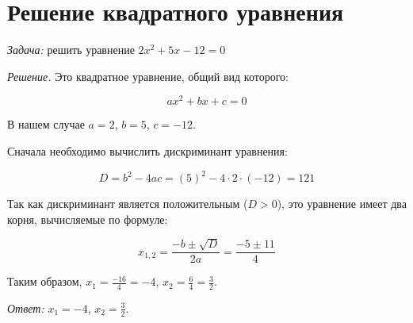 \documentclass[12pt]{article}
\begin{document}
\section{Решение квадратного уравнения}

\noindent \textit{Задача:} решить уравнение \( 2x^2 + 5x - 12 = 0 \)

\indent \textit{Решение.} Это квадратное уравнение, общий вид которого:

\[ ax^2 + bx + c = 0 \]


\noindent В нашем случае \( a = 2 \), \( b = 5 \), \( c = -12 \).

\indent Сначала необходимо вычислить дискриминант уравнения:

\[ D = b^2 - 4ac = (5)^2 - 4 \cdot 2 \cdot (-12) = 121 \]


\noindent Так как дискриминант является положительным (\( D > 0 \)), это уравнение
имеет два корня, вычисляемые по формуле:

\[ x_{1,2} = \frac {-b \pm \sqrt D} {2a} = \frac {-5 \pm 11} 4 \]


\noindent Таким образом, \( x_1 = \frac {-16} 4 = -4 \), \( x_2 = \frac 6 4 = \frac 3 2 \).

\indent \textit{Ответ:} \( x_1 = -4 \), \( x_2 = \frac 3 2 \).
\end{document}
